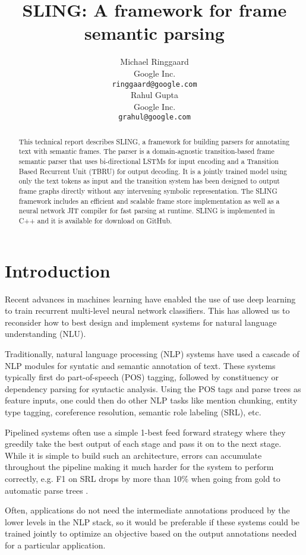 \documentclass[11pt,a4paper]{article}
\title{SLING: A framework for frame semantic parsing}
\author{
Michael Ringgaard \\ Google Inc. \\ {\tt ringgaard@google.com} \\\And
Rahul Gupta \\ Google Inc. \\ {\tt grahul@google.com} \\
}
\date{}
\begin{document}
\maketitle

\begin{abstract}
This technical report describes SLING, a framework for building
parsers for annotating text with semantic frames.
The parser is a domain-agnostic transition-based frame semantic parser that uses
bi-directional LSTMs for input encoding and a Transition Based Recurrent
Unit (TBRU) for output decoding.
It is a jointly trained model using only the text tokens as input and the
transition system has been designed to output frame graphs directly without
any intervening symbolic representation.
The SLING framework includes an efficient and scalable frame store
implementation as well as a neural network JIT compiler for fast parsing at
runtime.
SLING is implemented in C++ and it is available for download on GitHub.
\end{abstract}

\section{Introduction}

Recent advances in machines learning have enabled the use of use deep learning to
train recurrent multi-level neural network classifiers. This has allowed us to
reconsider how to best design and implement systems for natural language
understanding (NLU).

Traditionally, natural language processing (NLP) systems have used a cascade of
NLP modules for syntatic and semantic annotation of text.
These systems typically first do part-of-speech (POS) tagging, followed by
constituency or dependency parsing for syntactic analysis.
Using the POS tags and parse trees as feature inputs, one could then do other
NLP tasks like mention chunking, entity type tagging, coreference resolution,
semantic role labeling (SRL), etc.

Pipelined systems often use a simple 1-best feed forward strategy \cite{finkel2006}
where they greedily take the best output of each stage and pass it on to the
next stage.
While it is simple to build such an architecture, errors can accumulate
throughout the pipeline making it much harder for the system to perform
correctly, e.g. F1 on SRL drops by more than 10\% when going from gold to
automatic parse trees \cite{toutanova2005}.

Often, applications do not need the intermediate annotations produced
by the lower levels in the NLP stack, so it would be preferable if these systems
could be trained jointly to optimize an objective based on the output
annotations needed for a particular application.
\end{document}
